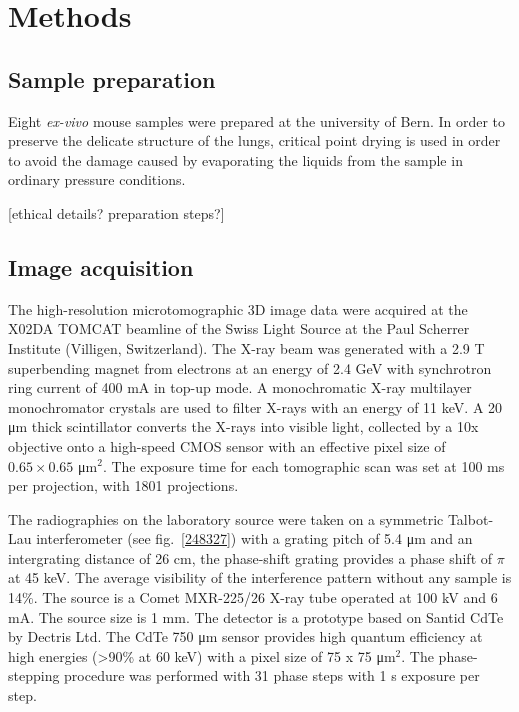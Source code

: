 \section{Methods}\label{sec:methods}
\subsection{Sample preparation}
Eight \emph{ex-vivo} mouse samples were prepared at the university of Bern.
In order to preserve the delicate structure of the lungs, critical point
drying is used in order to avoid the damage caused by evaporating the liquids
from the sample in ordinary pressure conditions.

[ethical details? preparation steps?]

\subsection{Image acquisition}\label{sec:acquisition}
The high-resolution microtomographic 3D image data were acquired at the X02DA
TOMCAT beamline of the Swiss Light Source at the Paul Scherrer Institute
(Villigen, Switzerland). The X-ray beam was generated with a 2.9 T superbending
magnet from electrons at an energy of 2.4 GeV with synchrotron ring current of 400 mA in top-up mode. A monochromatic X-ray  multilayer monochromator crystals are used
to filter X-rays with an energy of 11 keV. A 20 μm thick scintillator
converts the X-rays into visible light, collected by a 10x objective onto a
high-speed CMOS sensor with an effective pixel size of $0.65 \times 0.65$
μm$^2$. The exposure time for each tomographic scan was set at 100 ms per
projection, with 1801 projections.

The radiographies on the laboratory source were taken on a symmetric
Talbot-Lau interferometer (see fig.~\ref{248327}) with a grating pitch of 5.4 μm and an intergrating
distance of 26 cm, the phase-shift grating provides a phase shift of $\pi$
at 45 keV. The average visibility of the interference pattern without any
sample is 14\%. The source is a Comet MXR-225/26 X-ray tube operated at 100
kV and 6 mA. The source size is 1 mm. The detector is a prototype based on
Santid CdTe by Dectris Ltd. The CdTe 750 μm sensor provides high quantum
efficiency at high energies (>90\% at 60 keV) with a pixel size of 75 x 75
μm$^2$. The phase-stepping procedure was performed with 31 phase steps with
1 s exposure per step.
